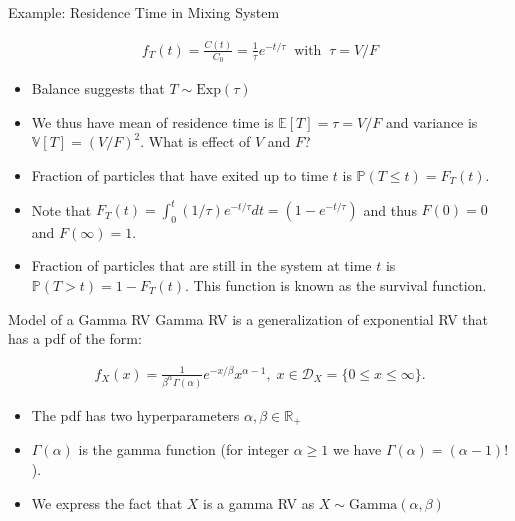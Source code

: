 \documentclass[handout,9pt]{beamer}
\begin{document}
%
\begin{frame}{Example: Residence Time in Mixing System}

\begin{block}{}
\begin{align*}
f_T(t)=\frac{C(t)}{C_0}= \frac{1}{\tau}e^{-t/\tau}\;\; \textrm{with}\;\; \tau=V/F
\end{align*}
\end{block}
\begin{itemize}
\item Balance suggests that $T\sim\textrm{Exp}(\tau)$  
\item We thus have mean of residence time is $\mathbb{E}[T]=\tau=V/F$ and variance is $\mathbb{V}[T]=(V/F)^2$.  What is effect of $V$ and $F$? 
\item Fraction of particles that have exited up to time $t$ is $\mathbb{P}(T\leq t)=F_T(t)$. 
\item Note that $F_T(t)=\int_{0}^t(1/\tau)e^{-t/\tau}dt=(1-e^{-t/\tau})$ and thus $F(0)=0$ and $F(\infty)=1$.
\item Fraction of particles that are still in the system at time $t$  is $\mathbb{P}(T>t)=1-F_T(t)$. This function is known as the survival function. 
\end{itemize}
\end{frame}

%
\begin{frame}{Model of a Gamma RV}
Gamma RV is a generalization of exponential RV that has a pdf of the form:
\begin{block}{}
\begin{align*}
f_X(x)=\frac{1}{\beta^\alpha \Gamma(\alpha)}e^{-x/\beta}x^{\alpha-1},\; x\in \mathcal{D}_X=\{0\leq x\leq \infty\}.
\end{align*}
\end{block}
\begin{itemize}
\setlength{\itemsep}{10pt}
\item The pdf has two hyperparameters $\alpha,\beta\in \mathbb{R}_+$
\item $\Gamma(\alpha)$ is the gamma function (for integer $\alpha\geq 1$ we have $\Gamma(\alpha)=(\alpha-1)!$). 
\item We express the fact that $X$ is a gamma RV as $X\sim \textrm{Gamma}(\alpha,\beta)$
\end{itemize}

\end{frame}
\end{document}

